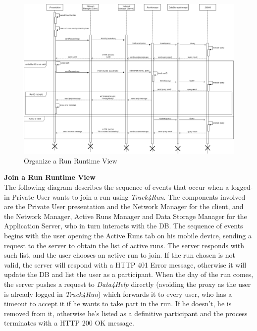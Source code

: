 \documentclass[titlepage]{article}
\begin{document}
\begin{figure}[H]
	\center
  	\includegraphics[width=15cm]{Organize.png}
  	\caption{Organize a Run Runtime View}
 	\label{fig:ORG}
\end{figure}
\noindent

{\bf Join a Run Runtime View }\\ 
The following diagram describes the sequence of events that occur when a logged-in Private User wants to join a run using {\it Track4Run}.
The components involved are the Private User presentation and the Network Manager for the client, and the Network Manager, Active Runs Manager and Data Storage Manager for the Application Server, who in turn interacts with the DB.
The sequence of events begins with the user opening the Active Runs tab on his mobile device, sending a request to the server to obtain the list of active runs. The server responds with such list, and the user chooses an active run to join. If the run chosen is not valid, the server will respond with a HTTP 401 Error message, otherwise it will update the DB and list the user as a participant.
When the day of the run comes, the server pushes a request to {\it Data4Help} directly (avoiding the proxy as the user is already logged in {\it Track4Run}) which forwards it to every user, who has a timeout to accept it if he wants to take part in the run. If he doesn’t, he is removed from it, otherwise he’s listed as a definitive participant and the process terminates with a HTTP 200 OK message.
\end{document}
